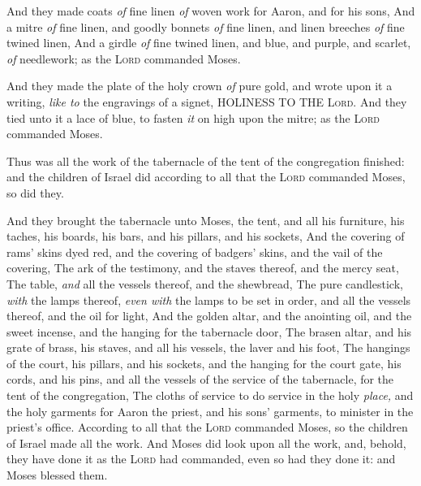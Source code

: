 \documentclass[11pt,letterpaper,oneside]{memoir}
\begin{document}
And they made coats \emph{of} fine linen \emph{of} woven work for Aaron,
and for his sons, And a mitre \emph{of} fine linen, and goodly bonnets
\emph{of} fine linen, and linen breeches \emph{of} fine twined linen,
And a girdle \emph{of} fine twined linen, and blue, and purple, and
scarlet, \emph{of} needlework; as the \textsc{Lord} commanded Moses.

And they made the plate of the holy crown \emph{of} pure gold, and wrote
upon it a writing, \emph{like to} the engravings of a signet, HOLINESS
TO THE \textsc{Lord}. And they tied unto it a lace of blue, to fasten
\emph{it} on high upon the mitre; as the \textsc{Lord} commanded Moses.

Thus was all the work of the tabernacle of the tent of the congregation
finished: and the children of Israel did according to all that the
\textsc{Lord} commanded Moses, so did they.

And they brought the tabernacle unto Moses, the tent, and all his
furniture, his taches, his boards, his bars, and his pillars, and his
sockets, And the covering of rams' skins dyed red, and the covering of
badgers' skins, and the vail of the covering, The ark of the testimony,
and the staves thereof, and the mercy seat, The table, \emph{and} all
the vessels thereof, and the shewbread, The pure candlestick,
\emph{with} the lamps thereof, \emph{even with} the lamps to be set in
order, and all the vessels thereof, and the oil for light, And the
golden altar, and the anointing oil, and the sweet incense, and the
hanging for the tabernacle door, The brasen altar, and his grate of
brass, his staves, and all his vessels, the laver and his foot, The
hangings of the court, his pillars, and his sockets, and the hanging for
the court gate, his cords, and his pins, and all the vessels of the
service of the tabernacle, for the tent of the congregation, The cloths
of service to do service in the holy \emph{place,} and the holy garments
for Aaron the priest, and his sons' garments, to minister in the
priest's office. According to all that the \textsc{Lord} commanded
Moses, so the children of Israel made all the work. And Moses did look
upon all the work, and, behold, they have done it as the \textsc{Lord}
had commanded, even so had they done it: and Moses blessed them.
\end{document}
